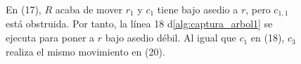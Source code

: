 \begin{figure}[!htbp]
\begin{tcbitemize}
{
                    }
    \end{tcbitemize}
    \captionsetup{font=footnotesize}
    \caption{En (17), $R$ acaba de mover $r_1$ y $c_1$ tiene bajo asedio a $r$,
    pero $c_{1,1}$ est\'a obstruida. Por tanto, la l\'inea 18
    d\cref{alg:captura_arbol1} se ejecuta para poner a $r$ bajo asedio d\'ebil.
    Al igual que $c_1$ en (18), $c_3$ realiza el mismo movimiento en (20).}
\end{figure}

